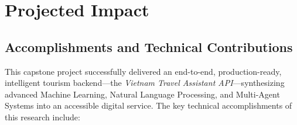 \chapter{Projected Impact}
\label{chap:projected_impact}

\section{Accomplishments and Technical Contributions}
\label{sec:accomplishments}

This capstone project successfully delivered an end-to-end, production-ready, intelligent tourism backend—the \textit{Vietnam Travel Assistant API}—synthesizing advanced Machine Learning, Natural Language Processing, and Multi-Agent Systems into an accessible digital service. The key technical accomplishments of this research include:

